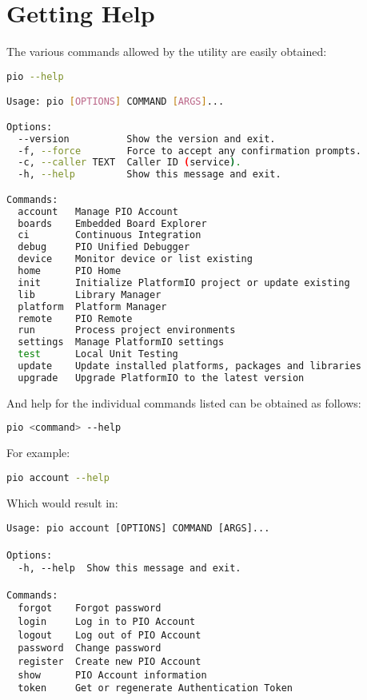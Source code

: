 \section{Getting Help}\label{section-getting-help}

The various commands allowed by the  utility are easily obtained:

\begin{lstlisting}[language={bash},numbers={none},caption={PIO - Getting Help}]
pio --help

Usage: pio [OPTIONS] COMMAND [ARGS]...

Options:
  --version          Show the version and exit.
  -f, --force        Force to accept any confirmation prompts.
  -c, --caller TEXT  Caller ID (service).
  -h, --help         Show this message and exit.

Commands:
  account   Manage PIO Account
  boards    Embedded Board Explorer
  ci        Continuous Integration
  debug     PIO Unified Debugger
  device    Monitor device or list existing
  home      PIO Home
  init      Initialize PlatformIO project or update existing
  lib       Library Manager
  platform  Platform Manager
  remote    PIO Remote
  run       Process project environments
  settings  Manage PlatformIO settings
  test      Local Unit Testing
  update    Update installed platforms, packages and libraries
  upgrade   Upgrade PlatformIO to the latest version
\end{lstlisting}    

And help for the individual commands listed can be obtained as follows:

\begin{lstlisting}[language={bash},numbers={none},caption={PIO - Getting Help on Commands}]
pio <command> --help
\end{lstlisting}    

For example:

\begin{lstlisting}[language={bash},numbers={none},caption={PIO - Getting Help on Commands}]
pio account --help
\end{lstlisting}

Which would result in:

\begin{lstlisting}[numbers={none},caption={PIO - Getting Command Help}]
Usage: pio account [OPTIONS] COMMAND [ARGS]...

Options:
  -h, --help  Show this message and exit.

Commands:
  forgot    Forgot password
  login     Log in to PIO Account
  logout    Log out of PIO Account
  password  Change password
  register  Create new PIO Account
  show      PIO Account information
  token     Get or regenerate Authentication Token
\end{lstlisting}




